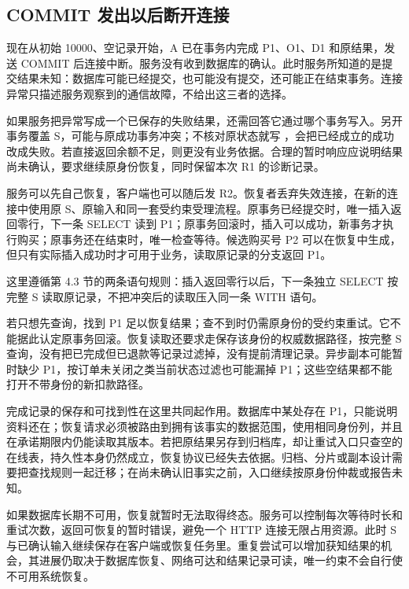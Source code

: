 \subsection*{COMMIT 发出以后断开连接}

现在从初始 10000、空记录开始，A 已在事务内完成 P1、O1、D1 和原结果，发送 COMMIT 后连接中断。服务没有收到数据库的确认。此时服务所知道的是提交结果未知：数据库可能已经提交，也可能没有提交，还可能正在结束事务。连接异常只描述服务观察到的通信故障，不给出这三者的选择。

如果服务把异常写成一个已保存的失败结果，还需回答它通过哪个事务写入。另开事务覆盖 S，可能与原成功事务冲突；不核对原状态就写 ，会把已经成立的成功改成失败。若直接返回余额不足，则更没有业务依据。合理的暂时响应应说明结果尚未确认，要求继续原身份恢复，同时保留本次 R1 的诊断记录。

服务可以先自己恢复，客户端也可以随后发 R2。恢复者丢弃失效连接，在新的连接中使用原 S、原输入和同一套受约束受理流程。原事务已经提交时，唯一插入返回零行，下一条 SELECT 读到 P1；原事务回滚时，插入可以成功，新事务才执行购买；原事务还在结束时，唯一检查等待。候选购买号 P2 可以在恢复中生成，但只有实际插入成功时才可用于业务，读取原记录的分支返回 P1。



这里遵循第 4.3 节的两条语句规则：插入返回零行以后，下一条独立 SELECT 按完整 S 读取原记录，不把冲突后的读取压入同一条 WITH 语句\cite{pg}。

若只想先查询，找到 P1 足以恢复结果；查不到时仍需原身份的受约束重试。它不能据此认定原事务回滚。恢复读取还要求走保存该身份的权威数据路径，按完整 S 查询，没有把已完成但已退款等记录过滤掉，没有提前清理记录。异步副本可能暂时缺少 P1，按订单未关闭之类当前状态过滤也可能漏掉 P1；这些空结果都不能打开不带身份的新扣款路径。



完成记录的保存和可找到性在这里共同起作用。数据库中某处存在 P1，只能说明资料还在；恢复请求必须被路由到拥有该事实的数据范围，使用相同身份列，并且在承诺期限内仍能读取其版本。若把原结果另存到归档库，却让重试入口只查空的在线表，持久性本身仍然成立，恢复协议已经失去依据。归档、分片或副本设计需要把查找规则一起迁移；在尚未确认旧事实之前，入口继续按原身份仲裁或报告未知。

如果数据库长期不可用，恢复就暂时无法取得终态。服务可以控制每次等待时长和重试次数，返回可恢复的暂时错误，避免一个 HTTP 连接无限占用资源。此时 S 与已确认输入继续保存在客户端或恢复任务里。重复尝试可以增加获知结果的机会，其进展仍取决于数据库恢复、网络可达和结果记录可读，唯一约束不会自行使不可用系统恢复。
\FloatBarrier

